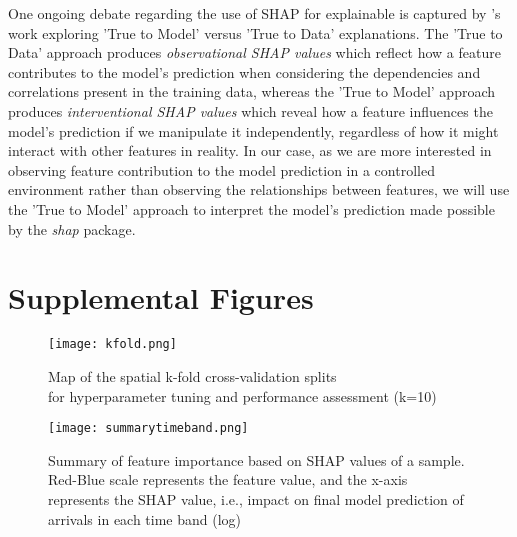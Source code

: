 One ongoing debate regarding the use of SHAP for explainable is captured by \citet{chenTrueModelTrue2020}'s work exploring 'True to Model' versus 'True to Data' explanations. The 'True to Data' approach produces \textit{observational SHAP values} which reflect how a feature contributes to the model's prediction when considering the dependencies and correlations present in the training data, whereas the 'True to Model' approach produces \textit{interventional SHAP values} which reveal how a feature influences the model's prediction if we manipulate it independently, regardless of how it might interact with other features in reality. In our case, as we are more interested in observing feature contribution to the model prediction in a controlled environment rather than observing the relationships between features, we will use the 'True to Model' approach to interpret the model's prediction made possible by the \textit{shap} package.

\section{Supplemental Figures}
\begin{figure}[ht]
    \centering
    \texttt{[image: kfold.png]}
    \captionsetup{justification=centering}
    \caption{Map of the spatial k-fold cross-validation splits\\for hyperparameter tuning and performance assessment (k=10)}
    \label{fig:kfold}
\end{figure}

\begin{figure}[!ht]
    \centering
    \texttt{[image: summarytimeband.png]}
    \captionsetup{justification=centering}
    \caption{Summary of feature importance based on SHAP values of a sample. Red-Blue scale represents the feature value, and the x-axis represents the SHAP value, i.e., impact on final model prediction of arrivals in each time band (log)}
    \label{fig:beeswarmtimeband}
\end{figure}
